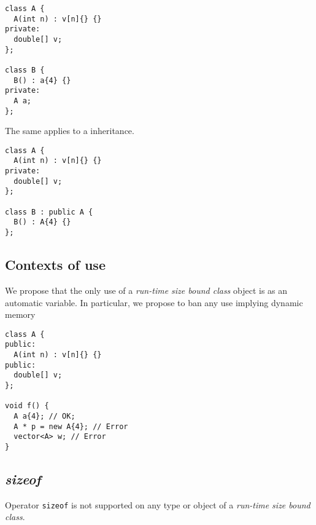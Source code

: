 \begin{lstlisting}
class A {
  A(int n) : v[n]{} {}
private:
  double[] v;
};

class B {
  B() : a{4} {}
private:
  A a;
};
\end{lstlisting}

The same applies to a inheritance.

\begin{lstlisting}
class A {
  A(int n) : v[n]{} {}
private:
  double[] v;
};

class B : public A {
  B() : A{4} {}
};
\end{lstlisting}

\subsection{Contexts of use}

We propose that the only use of a \emph{run-time size bound class} object is as
an automatic variable. In particular, we propose to ban any use implying dynamic
memory

\begin{lstlisting}
class A {
public:
  A(int n) : v[n]{} {}
public:
  double[] v;
};

void f() {
  A a{4}; // OK;
  A * p = new A{4}; // Error
  vector<A> w; // Error
}
\end{lstlisting}

\subsection{\emph{sizeof}}

Operator \verb+sizeof+ is not supported on any type or object of a \emph{run-time size bound class}.
